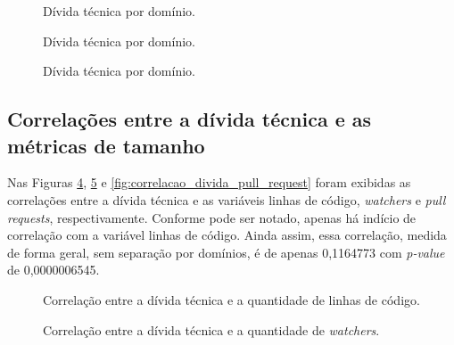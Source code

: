  \begin{figure}[H]
  \centering
  \caption{Dívida técnica por domínio.}
  \label{fig:linhas_codigo_topico} 
\end{figure}

 \begin{figure}[H]
  \centering
  \caption{Dívida técnica por domínio.}
  \label{fig:linhas_codigo_dominio} 
\end{figure}


 \begin{figure}[H]
  \centering
  \caption{Dívida técnica por domínio.}
  \label{fig:evolucao_linhas_codigo_dominio} 
\end{figure}


\subsection{Correlações entre a dívida técnica e as métricas de tamanho}

Nas Figuras \ref{fig:correlacao_divida_linhas_codigo},  \ref{fig:correlacao_divida_watchers} e \ref{fig:correlacao_divida_pull_request} foram exibidas as correlações entre a dívida técnica e as variáveis linhas de código, \textit{watchers} e \textit{pull requests}, respectivamente. Conforme pode ser notado, apenas há indício de correlação com a variável linhas de código. Ainda assim, essa correlação, medida de forma geral, sem separação por domínios, é de apenas 0,1164773  com \textit{p-value} de 0,0000006545. 

 \begin{figure}[H]
  \centering
  \caption{Correlação entre a dívida técnica e a quantidade de linhas de código.}
  \label{fig:correlacao_divida_linhas_codigo} 
\end{figure}

 \begin{figure}[H]
  \centering
  \caption{Correlação entre a dívida técnica e a quantidade de \textit{watchers}.}
  \label{fig:correlacao_divida_watchers} 
\end{figure}


